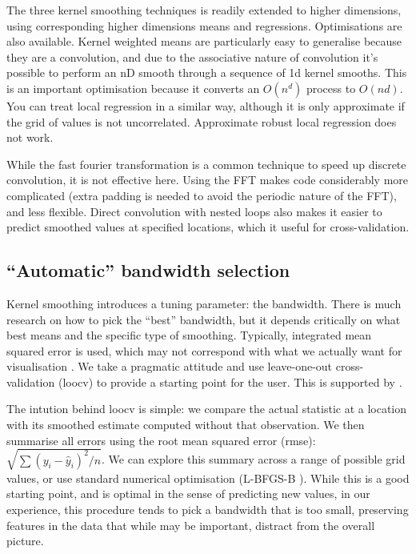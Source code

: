 \documentclass[journal]{vgtc}                %
\begin{document}
The three kernel smoothing techniques is readily extended to higher dimensions, using corresponding higher dimensions means and regressions. Optimisations are also available. Kernel weighted means are particularly easy to generalise because they are a convolution, and due to the associative nature of convolution it's possible to perform an nD smooth through a sequence of 1d kernel smooths. This is an important optimisation because it converts an $O(n^d)$ process to $O(nd)$.  You can treat local regression in a similar way, although it is only approximate if the grid of values is not uncorrelated. Approximate robust local regression does not work.

While the fast fourier transformation is a common technique to speed up discrete convolution, it is not effective here.  Using the FFT makes code considerably more complicated (extra padding is needed to avoid the periodic nature of the FFT), and less flexible. Direct convolution with nested loops also makes it easier to predict smoothed values at specified locations, which it useful for cross-validation.

\subsection{``Automatic'' bandwidth selection}

Kernel smoothing introduces a tuning parameter: the bandwidth. There is much research on how to pick the ``best'' bandwidth, but it depends critically on what best means and the specific type of smoothing. Typically, integrated mean squared error is used, which may not correspond with what we actually want for visualisation \citep{denby:2009}. We take a pragmatic attitude and use leave-one-out cross-validation (loocv) \citep{efron:1983} to provide a starting point for the user.  This is supported by \citep{loader:1999}.

The intution behind loocv is simple: we compare the actual statistic at a location with its smoothed estimate computed without that observation. We then summarise all errors using the root mean squared error (rmse): $\sqrt{ \sum (y_i - \hat{y}_i)^2 / n}$. We can explore this summary across a range of possible grid values, or use standard numerical optimisation (L-BFGS-B \citep{byrd:1995}). While this is a good starting point, and is optimal in the sense of predicting new values, in our experience, this procedure tends to pick a bandwidth that is too small, preserving features in the data that while may be important, distract from the overall picture.
\end{document}
